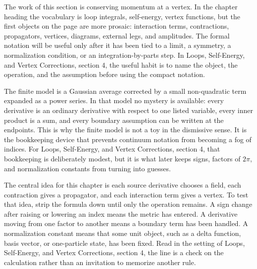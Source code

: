 











The work of this section is conserving momentum at a vertex.  In the chapter heading the vocabulary is loop integrals, self-energy, vertex functions, but the first objects on the page are more prosaic: interaction terms, contractions, propagators, vertices, diagrams, external legs, and amplitudes.  The formal notation will be useful only after it has been tied to a limit, a symmetry, a normalization condition, or an integration-by-parts step.  In Loops, Self-Energy, and Vertex Corrections, section 4, the useful habit is to name the object, the operation, and the assumption before using the compact notation.

The finite model is a Gaussian average corrected by a small non-quadratic term expanded as a power series.  In that model no mystery is available: every derivative is an ordinary derivative with respect to one listed variable, every inner product is a sum, and every boundary assumption can be written at the endpoints.  This is why the finite model is not a toy in the dismissive sense.  It is the bookkeeping device that prevents continuum notation from becoming a fog of indices.  For Loops, Self-Energy, and Vertex Corrections, section 4, that bookkeeping is deliberately modest, but it is what later keeps signs, factors of \(2\pi\), and normalization constants from turning into guesses.

The central idea for this chapter is each source derivative chooses a field, each contraction gives a propagator, and each interaction term gives a vertex.  To test that idea, strip the formula down until only the operation remains.  A sign change after raising or lowering an index means the metric has entered.  A derivative moving from one factor to another means a boundary term has been handled.  A normalization constant means that some unit object, such as a delta function, basis vector, or one-particle state, has been fixed.  Read in the setting of Loops, Self-Energy, and Vertex Corrections, section 4, the line is a check on the calculation rather than an invitation to memorize another rule.

